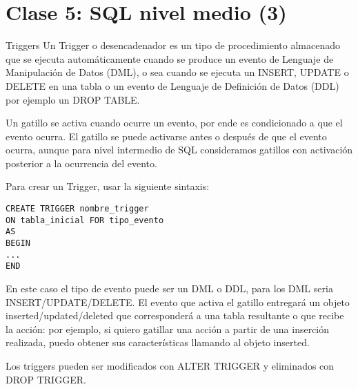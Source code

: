\hypertarget{clase-5-sql-nivel-medio-3}{%
\section{Clase 5: SQL nivel medio (3)}\label{clase-5-sql-nivel-medio-3}}

\begin{frame}[fragile]{Triggers}
\protect\hypertarget{triggers}{}
Un Trigger o desencadenador es un tipo de procedimiento almacenado que
se ejecuta automáticamente cuando se produce un evento de Lenguaje de
Manipulación de Datos (DML), o sea cuando se ejecuta un INSERT, UPDATE o
DELETE en una tabla o un evento de Lenguaje de Definición de Datos (DDL)
por ejemplo un DROP TABLE.

Un gatillo se activa cuando ocurre un evento, por ende es condicionado a
que el evento ocurra. El gatillo se puede activarse antes o después de
que el evento ocurra, aunque para nivel intermedio de SQL consideramos
gatillos con activación posterior a la ocurrencia del evento.

Para crear un Trigger, usar la siguiente sintaxis:

\begin{verbatim}
CREATE TRIGGER nombre_trigger
ON tabla_inicial FOR tipo_evento
AS
BEGIN
...
END
\end{verbatim}

En este caso el tipo de evento puede ser un DML o DDL, para los DML
seria INSERT/UPDATE/DELETE. El evento que activa el gatillo entregará un
objeto inserted/updated/deleted que corresponderá a una tabla resultante
o que recibe la acción: por ejemplo, si quiero gatillar una acción a
partir de una inserción realizada, puedo obtener sus características
llamando al objeto inserted.

Los triggers pueden ser modificados con ALTER TRIGGER y eliminados con
DROP TRIGGER.
\end{frame}


